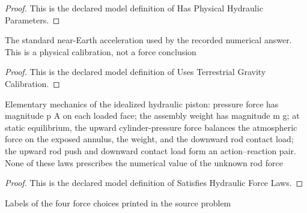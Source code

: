 \begin{proof}
  This is the declared model definition of Has Physical Hydraulic Parameters.
\end{proof}
\begin{definition}
  \label{def:physics:phyx-mini-0381:phyxminiproblems-problemphyxmini0381-usesterrestrialgravitycalibration}
  The standard near-Earth acceleration used by the recorded numerical answer. This is a physical calibration, not a force conclusion
\end{definition}
\begin{proof}
  This is the declared model definition of Uses Terrestrial Gravity Calibration.
\end{proof}
\begin{definition}
  \label{def:physics:phyx-mini-0381:phyxminiproblems-problemphyxmini0381-satisfieshydraulicforcelaws}
  Elementary mechanics of the idealized hydraulic piston: pressure force has magnitude p A on each loaded face; the assembly weight has magnitude m g; at static equilibrium, the upward cylinder-pressure force balances the atmospheric force on the exposed annulus, the weight, and the downward rod contact load; the upward rod push and downward contact load form an action--reaction pair. None of these laws prescribes the numerical value of the unknown rod force
\end{definition}
\begin{proof}
  This is the declared model definition of Satisfies Hydraulic Force Laws.
\end{proof}
\begin{definition}
  \label{def:physics:phyx-mini-0381:phyxminiproblems-problemphyxmini0381-answerchoice}
  Labels of the four force choices printed in the source problem
\end{definition}
